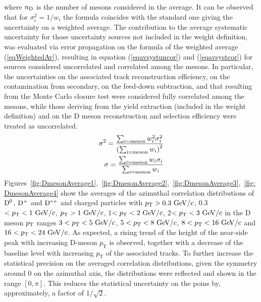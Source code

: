 where $n_{\rm D}$ is the number of mesons considered in the average.
It can be observed that for $\sigma^{2}_{i}=1/w_{i}$ the formula coincides with the standard one giving the uncertainty on a weighted average.
The contribution to the average systematic uncertainty for those uncertainty sources not included in the weight definition, was evaluated via error propagation on the formula of the weighted average (\ref{eqWeightedAv}), resulting in equation (\ref{eqavsystuncor}) and (\ref{eqavsystcor}) for sources
considered uncorrelated and correlated among the mesons. In particular, the uncertainties on the associated track reconstruction efficiency, on the
contamination from secondary, on the feed-down subtraction, and that resulting from the Monte Carlo closure test were considered fully correlated among
the mesons, while those deriving from the yield extraction (included in the weight definition) and on the D meson reconstruction and selection efficiency were treated as uncorrelated.
\begin{eqnarray}
  \sigma^{2}=\frac{\sum_{\rm i=meson}w_{i}^{2}\sigma^{2}_{i}}{\left( \sum_{\rm i=meson}w_{i}\right)^{2}}  \label{eqavsystuncor}\\
  \sigma=\frac{\sum_{\rm i=meson}w_{i}\sigma_{i}}{ \sum_{\rm i=meson}w_{i}}   \label{eqavsystcor}
\end{eqnarray}
Figures~\ref{fig:DmesonAverage1},~\ref{fig:DmesonAverage2},~\ref{fig:DmesonAverage3},~\ref{fig:DmesonAverage4} show the averages of the azimuthal correlation distributions of ${\rm D^0}$, ${\rm D^+}$ and ${\rm D^{*+}}$ and charged particles with $p_{\rm T}>0.3~\mathrm{GeV}/c$, 0.3$<p_{\rm T}<1~\mathrm{GeV}/c$, $p_{\rm T}>1~\mathrm{GeV}/c$, 1$<p_{\rm T}<2~\mathrm{GeV}/c$, 2$<p_{\rm T}<3~\mathrm{GeV}/c$ in the D meson $p_{\rm T}$ ranges $3<p_{\rm T}<5~\mathrm{GeV}/c$, $5<p_{\rm T}<8~\mathrm{GeV}/c$, $8<p_{\rm T}<16~\mathrm{GeV}/c$ and $16<p_{\rm T}<24~\mathrm{GeV}/c$.
As expected, a rising trend of the height of the near-side peak with increasing D-meson $p_\mathrm{T}$ is observed, together with a decrease of the baseline level with increasing $p_\mathrm{T}$ of the associated tracks.
To further increase the statistical precision on the averaged correlation distributions, given the symmetry around 0 on the azimuthal axis, the distributions were reflected and shown in the range $[0,\pi]$. This reduces the statistical uncertainty on the poins by, approximately, a factor of $1/\sqrt{2}$.
\clearpage


